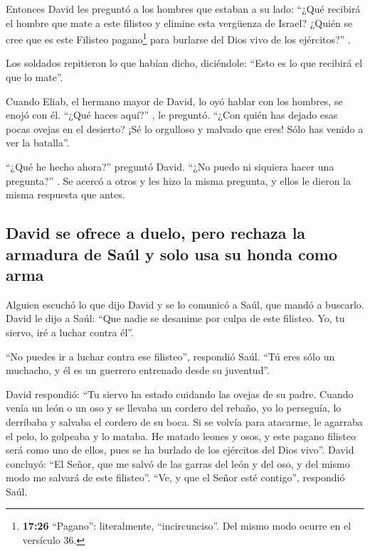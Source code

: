  Entonces David les preguntó a los hombres que estaban a
su lado: ``¿Qué recibirá el hombre que mate a este filisteo y elimine
esta vergüenza de Israel? ¿Quién se cree que es este Filisteo
pagano\footnote{\textbf{17:26} ``Pagano'': literalmente,
  ``incircunciso''. Del mismo modo ocurre en el versículo 36.} para
burlarse del Dios vivo de los ejércitos?'' .

 Los soldados repitieron lo que habían dicho, diciéndole:
``Esto es lo que recibirá el que lo mate''.

 Cuando Eliab, el hermano mayor de David, lo oyó hablar
con los hombres, se enojó con él. ``¿Qué haces aquí?'' , le preguntó.
``¿Con quién has dejado esas pocas ovejas en el desierto? ¡Sé lo
orgulloso y malvado que eres! Sólo has venido a ver la batalla''.

 ``¿Qué he hecho ahora?'' preguntó David. ``¿No puedo ni
siquiera hacer una pregunta?'' .  Se acercó a otros y les
hizo la misma pregunta, y ellos le dieron la misma respuesta que antes.

\hypertarget{david-se-ofrece-a-duelo-pero-rechaza-la-armadura-de-sauxfal-y-solo-usa-su-honda-como-arma}{%
\subsection{David se ofrece a duelo, pero rechaza la armadura de Saúl y
solo usa su honda como
arma}\label{david-se-ofrece-a-duelo-pero-rechaza-la-armadura-de-sauxfal-y-solo-usa-su-honda-como-arma}}

 Alguien escuchó lo que dijo David y se lo comunicó a
Saúl, que mandó a buscarlo.  David le dijo a Saúl: ``Que
nadie se desanime por culpa de este filisteo. Yo, tu siervo, iré a
luchar contra él''.

 ``No puedes ir a luchar contra ese filisteo'', respondió
Saúl. ``Tú eres sólo un muchacho, y él es un guerrero entrenado desde su
juventud''.

 David respondió: ``Tu siervo ha estado cuidando las
ovejas de su padre. Cuando venía un león o un oso y se llevaba un
cordero del rebaño,  yo lo perseguía, lo derribaba y
salvaba el cordero de su boca. Si se volvía para atacarme, le agarraba
el pelo, lo golpeaba y lo mataba.  He matado leones y
osos, y este pagano filisteo será como uno de ellos, pues se ha burlado
de los ejércitos del Dios vivo''.  David concluyó: ``El
Señor, que me salvó de las garras del león y del oso, y del mismo modo
me salvará de este filisteo''. ``Ve, y que el Señor esté contigo'',
respondió Saúl.

